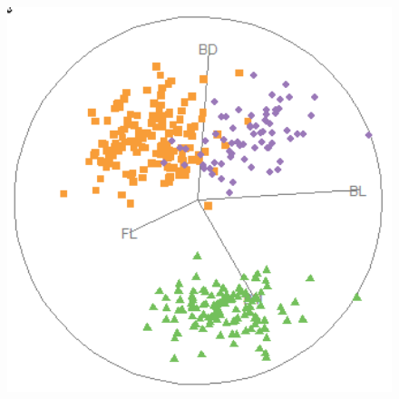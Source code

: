 \documentclass[
  letterpaper,
  10pt,
  krantz2]{krantz}
\begin{document}
{\begin{figure}
\begin{minipage}{0.33\linewidth}
{\includegraphics[width=1\textwidth,height=\textheight]{images/tours/peng-grand-tour2.png}

}


\end{minipage}%
%
\begin{minipage}{0.33\linewidth}

\end{minipage}
\end{figure}}
\end{document}
